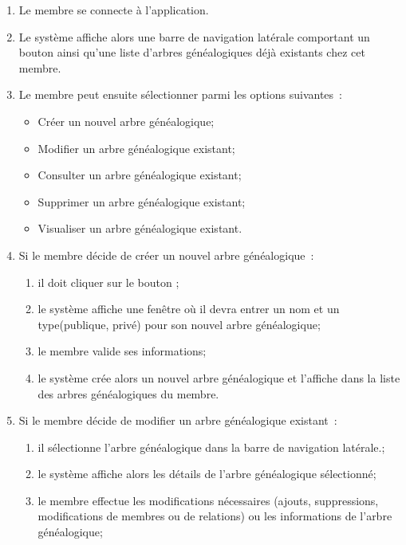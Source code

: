 \begin{enumerate}

  \item  Le membre se connecte à l’application.

  \item Le système affiche alors une barre de navigation latérale comportant un
    bouton  ainsi qu’une liste d’arbres généalogiques déjà
    existants chez cet membre.

  \item Le membre peut ensuite sélectionner parmi les options suivantes :
    \begin{itemize}
      \item Créer un nouvel arbre généalogique;
      \item Modifier un arbre généalogique existant;
      \item Consulter un arbre généalogique existant;
      \item Supprimer un arbre généalogique existant;
      \item Visualiser un arbre généalogique existant.
    \end{itemize}

  \item Si le membre décide de créer un nouvel arbre généalogique :
    \begin{enumerate}
      \item il doit cliquer sur le bouton ;
      \item le système affiche une fenêtre où il devra entrer un nom et un type(publique, privé)
        pour son nouvel arbre généalogique;
      \item le membre valide ses informations;
      \item le système crée alors un nouvel arbre généalogique et l’affiche dans la liste des arbres
        généalogiques du membre.
    \end{enumerate}

  \item  Si le membre décide de modifier un arbre généalogique existant :
    \begin{enumerate}
      \item il sélectionne l’arbre généalogique dans la barre de navigation latérale.;
      \item le système affiche alors les détails de l’arbre généalogique sélectionné;
      \item le membre effectue les modifications nécessaires (ajouts,
        suppressions, modifications de membres ou de relations) ou les
        informations de l’arbre généalogique;


\end{enumerate}
\end{enumerate}
